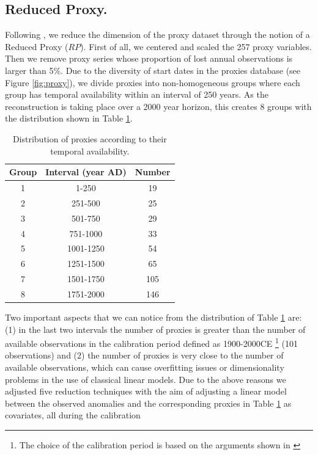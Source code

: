 \documentclass[11pt]{amsart}
\theoremstyle{plain}
\theoremstyle{definition}
\theoremstyle{remark}
\begin{document}
\subsection{Reduced Proxy.}
\label{sec:rp}
Following \cite{Barboza2014}, we reduce the dimension of the proxy dataset
through the notion of a Reduced Proxy ($RP$). First of all, we centered and
scaled the 257 proxy variables. Then we remove proxy series whose proportion of lost
annual 
observations is larger than 5\%. Due to the diversity of start
dates in the proxies database (see Figure \ref{fig:proxy}), we divide
proxies into non-homogeneous groups where each group has temporal availability within an
interval of 250 years. As the reconstruction is taking place over a 2000 year
horizon, this creates 8 groups with the distribution shown in Table \ref{tab:distdate}.
\begin{table}
  \centering
  \begin{tabular}{c|c|c}
    \toprule
    Group & Interval (year AD) & Number \\
    \midrule
    1 & 1-250 & 19 \\
    2 & 251-500 & 25 \\
    3 & 501-750 & 29 \\
    4 & 751-1000 & 33 \\
    5 & 1001-1250 & 54 \\
    6 & 1251-1500 & 65 \\
    7 & 1501-1750 & 105 \\
    8 & 1751-2000 & 146 \\
    \bottomrule
  \end{tabular}
  \caption{Distribution of proxies according to their temporal availability.}
  \label{tab:distdate}
\end{table}
Two important aspects that we can notice from the distribution of Table
\ref{tab:distdate} are: (1) in the last two intervals the number of proxies is greater than
the number of available observations in the calibration period defined as
1900-2000CE \footnote{The choice of the calibration period is based on the
  arguments shown in \cite{Barboza2014}} (101 observations) and (2) the number of proxies is very close to the
number of available observations, which can cause overfitting issues or
dimensionality problems in the use of classical linear models. Due to the above
reasons we adjusted five reduction techniques with the aim of adjusting
a linear model between the observed anomalies and the corresponding proxies in
Table \ref{tab:distdate} as covariates, all during the calibration
\end{document}
